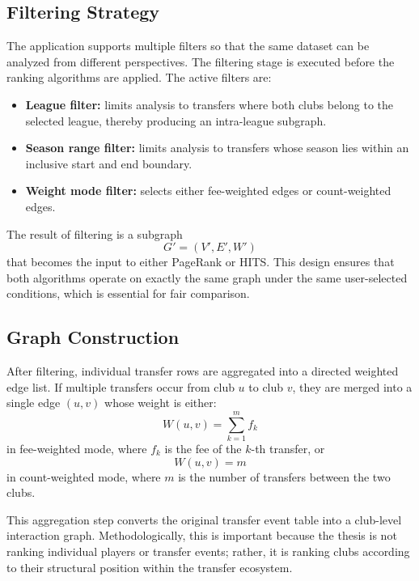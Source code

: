 \subsection{Filtering Strategy}
\label{subsec:filtering}

The application supports multiple filters so that the same dataset can be analyzed from different perspectives. The filtering stage is executed before the ranking algorithms are applied. The active filters are:

\begin{itemize}
    \item \textbf{League filter:} limits analysis to transfers where both clubs belong to the selected league, thereby producing an intra-league subgraph.
    \item \textbf{Season range filter:} limits analysis to transfers whose season lies within an inclusive start and end boundary.
    \item \textbf{Weight mode filter:} selects either fee-weighted edges or count-weighted edges.
\end{itemize}

The result of filtering is a subgraph
\[
G' = (V', E', W')
\]
that becomes the input to either PageRank or HITS. This design ensures that both algorithms operate on exactly the same graph under the same user-selected conditions, which is essential for fair comparison.


\subsection{Graph Construction}
\label{subsec:graph_construction}

After filtering, individual transfer rows are aggregated into a directed weighted edge list. If multiple transfers occur from club $u$ to club $v$, they are merged into a single edge $(u,v)$ whose weight is either:
\[
W(u,v) = \sum_{k=1}^{m} f_k
\]
in fee-weighted mode, where $f_k$ is the fee of the $k$-th transfer, or
\[
W(u,v) = m
\]
in count-weighted mode, where $m$ is the number of transfers between the two clubs.

This aggregation step converts the original transfer event table into a club-level interaction graph. Methodologically, this is important because the thesis is not ranking individual players or transfer events; rather, it is ranking clubs according to their structural position within the transfer ecosystem.


